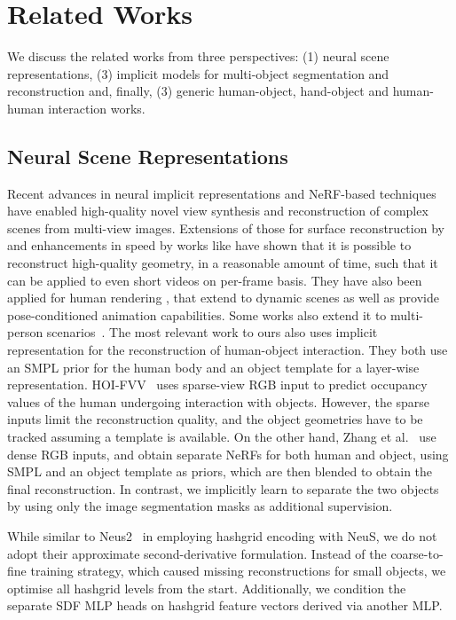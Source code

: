 \section{Related Works}
\label{sec:related_works}

We discuss the related works from three perspectives: 
(1) neural scene representations, (3) implicit models for multi-object segmentation and reconstruction and, finally, (3) generic human-object, hand-object and human-human interaction works. 

\subsection{Neural Scene Representations}

Recent advances in neural implicit representations and NeRF-based techniques \cite{mildenhall2020nerf, Tewari2022NeuRendSTAR} have enabled high-quality novel view synthesis and reconstruction of complex scenes from multi-view images. 
Extensions of those for surface reconstruction by \cite{wang2021neus,yariv2021volume,Oechsle2021ICCV_unisurf} and enhancements in speed by works like \cite{mueller2022instant, neus2, rosu2023permutosdf} have shown that it is possible to reconstruct high-quality geometry, in a reasonable amount of time, such that it can be applied to even short videos on per-frame basis.
They have also been 
applied for human rendering \cite{peng2021neuralbody,liu2021neuralactor,weng2022humannerf,zhao2022instantnsr, sun2024metacap}, that extend to dynamic scenes as well as provide pose-conditioned animation capabilities. 
Some works also extend it to multi-person scenarios~\cite{shuai2022multinb,zhang2021stnerf,Menapace2024ToG}.
The most relevant work to ours  \cite{zhang2023neuraldome, sun2021hoifvv} also uses implicit representation for the reconstruction of human-object interaction. 
They both use an SMPL prior \cite{SMPL:2015, SMPL-X:2019} for the human body and an object template for a layer-wise representation. 
HOI-FVV~\cite{sun2021hoifvv} uses sparse-view RGB input to predict occupancy values of the human undergoing interaction with objects.
However, the sparse inputs limit the reconstruction quality, and the object geometries have to be tracked assuming a template is available. 
On the other hand, Zhang et al.~\cite{zhang2023neuraldome} use dense RGB inputs, and obtain separate NeRFs for both human and object, using SMPL and an object template as priors, which are then blended 
to obtain the final reconstruction. 
In contrast, we implicitly learn to separate the two objects by using only the image segmentation masks as additional supervision. 
\par
While similar to Neus2~\cite{neus2} in employing hashgrid encoding with NeuS, we do not adopt their approximate second-derivative formulation. Instead of the coarse-to-fine training strategy, which caused missing reconstructions for small objects, we optimise all hashgrid levels from the start. Additionally, we condition the separate SDF MLP heads on hashgrid feature vectors derived via another MLP.


